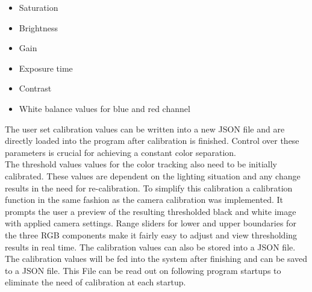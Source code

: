 \begin{itemize}
\item Saturation
\item Brightness
\item Gain
\item Exposure time
\item Contrast
\item White balance values for blue and red channel
\end{itemize}
The user set calibration values can be written into a new JSON file and are directly loaded into the program after calibration is finished. Control over these parameters is crucial for achieving a constant color separation. \\The threshold values values for the color tracking also need to be initially calibrated. These values are dependent on the lighting situation and any change results in the need for re-calibration. To simplify this calibration a calibration function in the same fashion as the camera calibration was implemented.  It prompts the user a preview of the resulting thresholded black and white image with applied camera settings. Range sliders for lower and upper boundaries for the three RGB components make it fairly easy to adjust and view thresholding results in real time. The calibration values can also be stored into a JSON file. The calibration values will be fed into the system after finishing and can be saved to a JSON file. This File can be read out on following program startups to eliminate the need of calibration at each startup.

